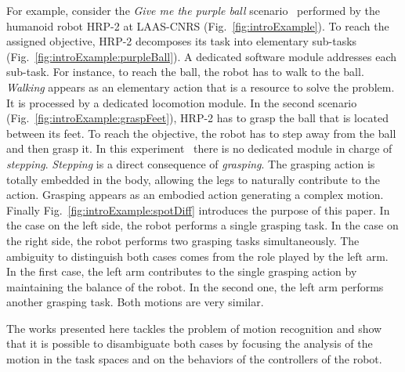 \documentclass[letterpaper, 10pt, conference]{ieeeconf}      %
\begin{document}
For example, consider the \emph{Give me the purple ball} scenario~\cite{yoshida07}
performed by the humanoid robot HRP-2 at LAAS-CNRS (Fig.~\ref{fig:introExample}). To reach the assigned
objective, HRP-2 decomposes its task into elementary sub-tasks
(Fig.~\ref{fig:introExample:purpleBall}). A dedicated software module addresses each
sub-task. For instance,
to reach the ball, the robot has to walk to the ball. \emph{Walking} appears as an
elementary action that is a resource to solve the problem. It is processed by a
dedicated locomotion module. In the second scenario (Fig.~\ref{fig:introExample:graspFeet}),
HRP-2 has to grasp the ball that is located between its feet. To reach the
objective, the robot has to step away from the ball and then grasp it. In this
experiment~\cite{kanoun10} there is no dedicated module in charge of \emph{stepping}. \emph{Stepping} is
a direct consequence of \emph{grasping}. The grasping action is totally embedded in
the body, allowing the legs to naturally contribute to the action. Grasping
appears as an embodied action generating a complex motion. Finally Fig.~\ref{fig:introExample:spotDiff}
introduces the purpose of this paper. In the case on the left side, the robot
performs a single grasping task. In the case on the right side, the robot
performs two grasping tasks simultaneously. The ambiguity to distinguish both
cases comes from the role played by the left arm. In the first case, the left
arm contributes to the single grasping action by maintaining the balance of the
robot. In the second one, the left arm performs another grasping task. Both
motions are very similar. 

The works presented here tackles the problem of motion recognition and 
show that it is possible to disambiguate both cases by focusing
the analysis of the motion in the task spaces and on
the behaviors of the controllers of the robot.
\end{document}
